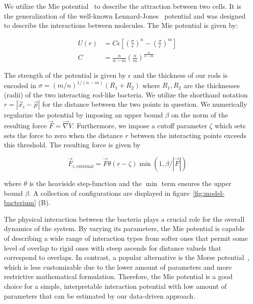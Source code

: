 \documentclass{article}
\begin{document}
We utilize the Mie potential~\cite{Mie1903} to describe the attraction between two cells.
It is the generalization of the well-known Lennard-Jones~\cite{Jones1924} potential and was designed
to describe the interactions between molecules.
The Mie potential is given by:

\begin{align}
    U(r) &= C\epsilon\left[ \left(\frac{\sigma}{r}\right)^n -
        \left(\frac{\sigma}{r}\right)^m\right]\\
    C &= \frac{n}{n-m}\left(\frac{n}{m}\right)^{\frac{n}{n-m}}
\end{align}

The strength of the potential is given by $\epsilon$ and the thickness of our rods
is encoded in $\sigma = (m/n)^{1/(n-m)}(R_1+R_2)$ where $R_1,R_2$ are the thicknesses (radii) of the
two interacting rod-like bacteria.
We utilize the shorthand notation $r=|\vec{x}_i - \vec{p}|$ for the distance between the two points
in question.
We numerically regularize the potential by imposing an upper bound $\beta$ on the norm of the
resulting force $\vec{F} = \vec{\nabla} V$.
Furthermore, we impose a cutoff parameter $\zeta$ which sets sets the force to zero when the
distance $r$ between the interacting points exceeds this threshold.
The resulting force is given by

\begin{equation}
    \vec{F}_{i,\text{external}} = \vec{F} \theta(r-\zeta) \min\left(1, \beta / |\vec{F}|\right)
\end{equation}

where $\theta$ is the heaviside step-function and the $\min$ term ensures the upper bound $\beta$.
A collection of configurations are displayed in figure~\ref{fig:model-bacterium} (B).

The physical interaction between the bacteria plays a crucial role for the overall dynamics of the
system.
By varying its parameters, the Mie potential is capable of describing a wide range of interaction
types from softer ones that permit some level of overlap to rigid ones with steep ascends for
distance valuels that correspond to overlaps.
In contrast, a popular alternative is the Morse potential~\cite{Morse1929}, which is less
customizable due to the lower amount of parameters and more restrictive mathematical formulation.
Therefore, the Mie potential is a good choice for a simple, interpretable interaction potential with
low amount of parameters that can be estimated by our data-driven approach.
\end{document}
